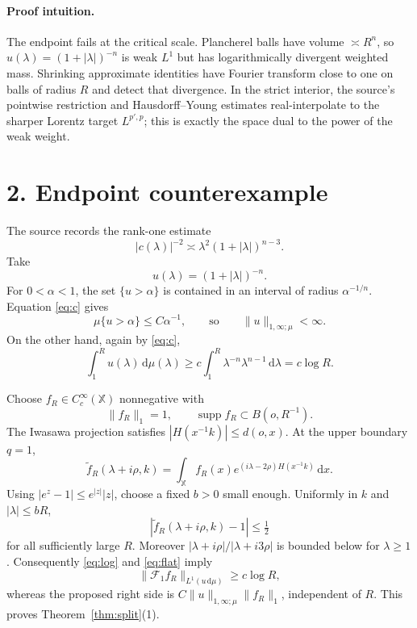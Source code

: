 \documentclass[10pt,a4paper]{article}
\newcommand{\X}{\mathbb X}
\newcommand{\dd}{\,\mathrm d}
\newcommand{\supp}{\operatorname{supp}}
\begin{document}
\paragraph{Proof intuition.}
The endpoint fails at the critical scale.  Plancherel balls have volume
$\asymp R^n$, so $u(\lambda)=(1+|\lambda|)^{-n}$ is weak $L^1$ but has
logarithmically divergent weighted mass.  Shrinking approximate identities
have Fourier transform close to one on balls of radius $R$ and detect that
divergence.  In the strict interior, the source's pointwise restriction and
Hausdorff--Young estimates real-interpolate to the sharper Lorentz target
$L^{p',p}$; this is exactly the space dual to the power of the weak weight.

\section*{2. Endpoint counterexample}

The source records the rank-one estimate
\begin{equation}\label{eq:c}
 |c(\lambda)|^{-2}\asymp
 \lambda^2(1+|\lambda|)^{n-3}.
\end{equation}
Take
\[
 u(\lambda)=(1+|\lambda|)^{-n}.
\]
For $0<\alpha<1$, the set $\{u>\alpha\}$ is contained in an interval of
radius $\alpha^{-1/n}$.  Equation \eqref{eq:c} gives
\[
 \mu\{u>\alpha\}\le C\alpha^{-1},
 \qquad\text{so}\qquad \|u\|_{1,\infty;\mu}<\infty.
\]
On the other hand, again by \eqref{eq:c},
\begin{equation}\label{eq:log}
 \int_1^R u(\lambda)\dd\mu(\lambda)
 \ge c\int_1^R\lambda^{-n}\lambda^{n-1}\dd\lambda
 =c\log R.
\end{equation}

Choose $f_R\in C_c^\infty(\X)$ nonnegative with
\[
 \|f_R\|_1=1,
 \qquad \supp f_R\subset B(o,R^{-1}).
\]
The Iwasawa projection satisfies
$|H(x^{-1}k)|\le d(o,x)$.  At the upper boundary $q=1$,
\[
 \widetilde f_R(\lambda+i\rho,k)
 =\int_\X f_R(x)e^{(i\lambda-2\rho)H(x^{-1}k)}\dd x.
\]
Using $|e^z-1|\le e^{|z|}|z|$, choose a fixed $b>0$ small enough.  Uniformly
in $k$ and $|\lambda|\le bR$,
\begin{equation}\label{eq:flat}
 |\widetilde f_R(\lambda+i\rho,k)-1|\le\tfrac12
\end{equation}
for all sufficiently large $R$.  Moreover
$|\lambda+i\rho|/|\lambda+i3\rho|$ is bounded below for $\lambda\ge1$.
Consequently \eqref{eq:log} and \eqref{eq:flat} imply
\[
 \|\mathcal F_1f_R\|_{L^1(u\dd\mu)}\ge c\log R,
\]
whereas the proposed right side is
$C\|u\|_{1,\infty;\mu}\|f_R\|_1$, independent of $R$.  This proves
Theorem~\ref{thm:split}(1).
\end{document}
